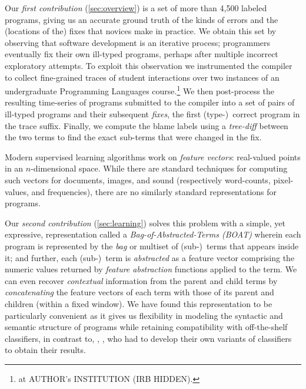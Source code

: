 Our \emph{first contribution} (\autoref{sec:overview})
is a set of more than 4,500 labeled programs,
giving us an accurate ground truth of
the kinds of errors and the (locations
of the) fixes that novices make in
practice.
%
We obtain this set by observing that
software development is an iterative
process; programmers eventually
fix their own ill-typed programs,
perhaps after multiple incorrect
exploratory attempts.
%
To exploit this observation we instrumented
the \ocaml compiler to collect fine-grained
traces of student interactions over two instances
of an undergraduate Programming Languages
course.\footnote{
at AUTHOR's INSTITUTION (IRB HIDDEN).
}
%
We then post-process the resulting time-series
of programs submitted to the \ocaml compiler into
a set of pairs of ill-typed programs and their
subsequent \emph{fixes}, the first (type-)~correct
program in the trace suffix.
%
Finally, we compute the blame labels using a
\emph{tree-diff} between the two terms to find
the exact sub-terms that were changed in the fix.

%
Modern supervised learning algorithms work on %
\emph{feature vectors}: real-valued points in an
$n$-dimensional space. While there are standard
techniques for computing such
vectors for documents, images, and sound (respectively
word-counts, pixel-values, and frequencies),
there are no similarly standard representations for
programs.

Our \emph{second contribution} (\autoref{sec:learning})
solves this problem with a simple, yet expressive, representation called
a \emph{Bag-of-Abstracted-Terms (BOAT)} wherein
each program is represented by the \emph{bag}
or multiset of (sub-)~terms that appears inside
it; and further, each (sub-)~term is \emph{abstracted}
as a feature vector comprising the numeric values
returned by \emph{feature abstraction} functions
applied to the term.
%
%
We can even recover \emph{contextual} information
from the parent and child terms by
\emph{concatenating} the feature vectors of each term
with those of its parent and children
(within a fixed window).
%
We have found this representation to be particularly
convenient as it gives us flexibility in modeling the
syntactic and semantic structure of programs while
retaining compatibility with off-the-shelf classifiers,
in contrast to, \eg, \citet{Raychev2015-jg}, who had
to develop their own variants of classifiers to obtain
their results.

